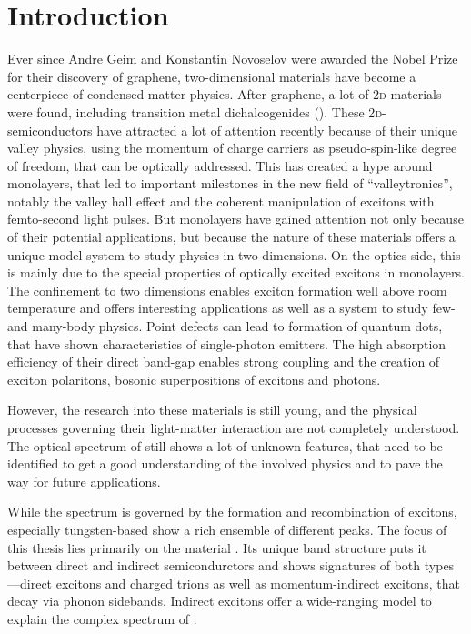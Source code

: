 \chapter{Introduction}
Ever since Andre Geim and Konstantin Novoselov were awarded the Nobel Prize for their discovery of graphene, two-dimensional materials have become a centerpiece of condensed matter physics\cite{novoselov_electric_2004}. After graphene, a lot of 2\textsc{d} materials were found, including transition metal dichalcogenides (\tmds\!). These 2\textsc{d}-semiconductors have attracted a lot of attention recently because of their unique valley physics, using the momentum of charge carriers as pseudo-spin-like degree of freedom, that can be optically addressed\cite{wang_electronics_2012}. This has created a hype around \tmdg monolayers, that led to important milestones in the new field of ``valleytronics'', notably the valley hall effect\cite{mak_valley_2014} and the coherent manipulation of excitons with femto-second light pulses\cite{langer_lightwave_2018}. But \tmdg monolayers have gained attention not only because of their potential applications, but because the nature of these materials offers a unique model system to study physics in two dimensions. On the optics side, this is mainly due to the special properties of optically excited excitons in \tmdg monolayers. The confinement to two dimensions enables exciton formation well above room temperature and offers interesting applications as well as a system to study few- and many-body physics\cite{chernikov_exciton_2014}. Point defects can lead to formation of quantum dots, that have shown characteristics of single-photon emitters\cite{srivastava_optically_2015}. The high absorption efficiency of their direct band-gap enables strong coupling and the creation of exciton polaritons, bosonic superpositions of excitons and photons\cite{liu_control_2017,zhang_photonic-crystal_2018}.

However, the research into these materials is still young, and the physical processes governing their light-matter interaction are not completely understood\cite{koperski_optical_2017}. The optical spectrum of \tmds still shows a lot of unknown features, that need to be identified to get a good understanding of the involved physics and to pave the way for future applications. 

While the spectrum is governed by the formation and recombination of excitons, especially tungsten-based \tmds show a rich ensemble of different peaks. The focus of this thesis lies primarily on the material \wse\!. Its unique band structure puts it between direct and indirect semicondurctors and shows signatures of both types---direct excitons and charged trions as well as momentum-indirect excitons, that decay via phonon sidebands. Indirect excitons offer a wide-ranging model to explain the complex spectrum of \wse\!. 

